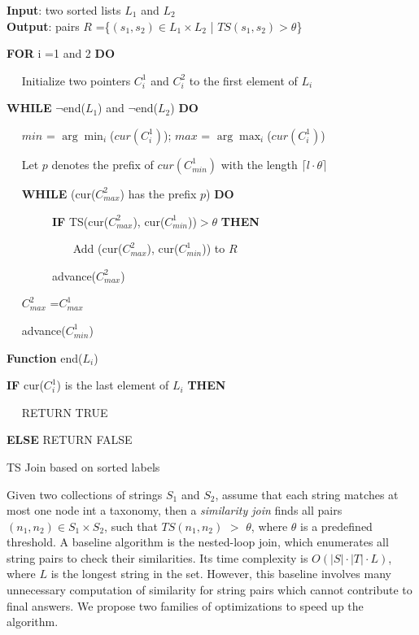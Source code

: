 \begin{algorithm}
{\bf Input}: two sorted lists  $L_1$ and $L_2$\\
{\bf Output}: pairs $R$ =\{$(s_1,s_2) \in L_1 \times L_2$ | $TS(s_1, s_2) > \theta$\}
\begin{compactenum}[(1)]
\item {\bf FOR}  i =1 and 2 {\bf DO}
\item ~~ Initialize two pointers $C_i^1$ and $C_i^2$ to the first element of  $L_i$
\item {\bf WHILE}  $\neg$end($L_1$) and $\neg$end($L_2$) {\bf DO}
\item ~~ $min$ = $\arg\min_{i}$($cur(C_i^1)$); $max$ = $\arg\max_{i}$($cur(C_i^1)$)
\item ~~ Let $p$ denotes the prefix of $cur(C_{min}^1)$ with the length $  \lceil l \cdot \theta \rceil$
\item ~~ {\bf WHILE} (cur($C_{max}^2$) has the prefix $p$) {\bf DO}
\item ~~ ~~ ~~ {\bf IF} TS(cur($C_{max}^2$), cur($C_{min}^1$))$> \theta$ {\bf THEN}
\item ~~~   ~~ ~~ ~~ Add (cur($C_{max}^2$), cur($C_{min}^1$)) to $R$
\item ~~ ~~ ~~  advance($C_{max}^2$)
\item ~~ $C_{max}^2$ =$C_{max}^1$
\item ~~ advance($C_{min}^1$)
\end{compactenum}
\smallskip
\textbf{Function} end($L_i$)
\begin{compactenum}[(1)]
\item {\bf IF}  cur($C_i^1$) is the last element of $L_i$ {\bf THEN}
\item  ~~ RETURN TRUE
\item   {\bf ELSE} RETURN FALSE
\end{compactenum}
\caption{TS Join based on sorted labels}
\label{alg:exactjoin}
\end{algorithm}


 Given two collections of strings $S_1$ and $S_2$, assume that each string matches at most one node int a taxonomy,  then a \textit{
  similarity join} finds all pairs $(n_1, n_2) \in S_1 \times S_2$,
such that $TS(n_1,n_2)$ $>$ $\theta$, where $\theta$ is a predefined threshold. A baseline algorithm is the nested-loop join, which enumerates all string pairs to check their similarities. Its time complexity is $O(|S| \cdot |T| \cdot L)$, where $L$ is the longest string in the set. However, this baseline involves many unnecessary computation of similarity for string pairs which cannot contribute to final answers. We propose two families of optimizations to speed up the algorithm.


